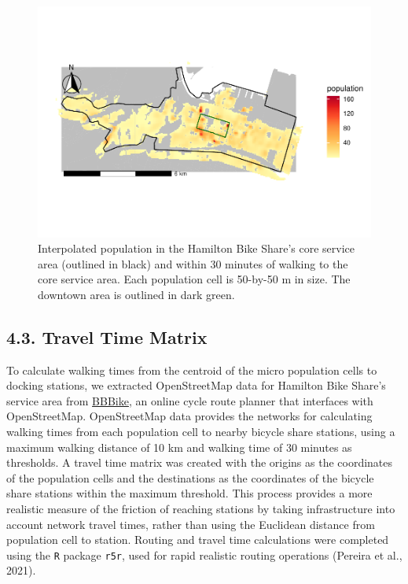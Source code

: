 \documentclass[]{elsarticle} %
\begin{document}
\begin{figure}

{\centering \includegraphics[width=0.9\linewidth]{Bike-share-spatial-equity_files/figure-latex/interpolated-population-1} 

}

\caption{Interpolated population in the Hamilton Bike Share's core service area (outlined in black) and within 30 minutes of walking to the core service area. Each population cell is 50-by-50 m in size. The downtown area is outlined in dark green.}\label{fig:interpolated-population}
\end{figure}

\hypertarget{travel-time-matrix}{%
\subsection{4.3. Travel Time Matrix}\label{travel-time-matrix}}

To calculate walking times from the centroid of the micro population
cells to docking stations, we extracted OpenStreetMap data for Hamilton
Bike Share's service area from
\href{https://download.bbbike.org/osm/bbbike/}{BBBike}, an online cycle
route planner that interfaces with OpenStreetMap. OpenStreetMap data
provides the networks for calculating walking times from each population
cell to nearby bicycle share stations, using a maximum walking distance
of 10 km and walking time of 30 minutes as thresholds. A travel time
matrix was created with the origins as the coordinates of the population
cells and the destinations as the coordinates of the bicycle share
stations within the maximum threshold. This process provides a more
realistic measure of the friction of reaching stations by taking
infrastructure into account network travel times, rather than using the
Euclidean distance from population cell to station. Routing and travel
time calculations were completed using the \texttt{R} package
\texttt{r5r}, used for rapid realistic routing operations (Pereira et
al., 2021).
\end{document}
